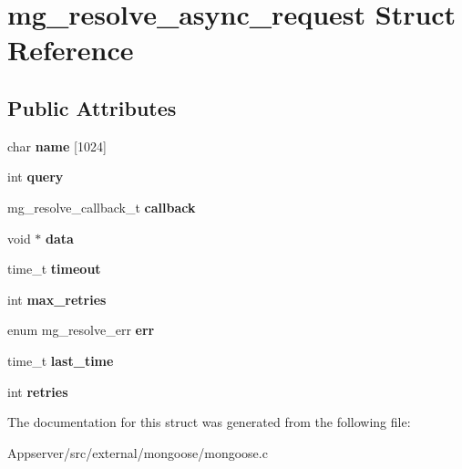 \hypertarget{structmg__resolve__async__request}{}\section{mg\+\_\+resolve\+\_\+async\+\_\+request Struct Reference}
\label{structmg__resolve__async__request}
\subsection*{Public Attributes}
\begin{DoxyCompactItemize}
\item 
char {\bfseries name} \mbox{[}1024\mbox{]}\hypertarget{structmg__resolve__async__request_a3d5bd5daeb6672a070322e3cf304eb75}{}\label{structmg__resolve__async__request_a3d5bd5daeb6672a070322e3cf304eb75}

\item 
int {\bfseries query}\hypertarget{structmg__resolve__async__request_aa7f0cbfc40e85f445d117e5804825dbe}{}\label{structmg__resolve__async__request_aa7f0cbfc40e85f445d117e5804825dbe}

\item 
mg\+\_\+resolve\+\_\+callback\+\_\+t {\bfseries callback}\hypertarget{structmg__resolve__async__request_ae07665c233e6a23b2e87075e325b0cab}{}\label{structmg__resolve__async__request_ae07665c233e6a23b2e87075e325b0cab}

\item 
void $\ast$ {\bfseries data}\hypertarget{structmg__resolve__async__request_aebb9fce193633d8f2112077ad1b39078}{}\label{structmg__resolve__async__request_aebb9fce193633d8f2112077ad1b39078}

\item 
time\+\_\+t {\bfseries timeout}\hypertarget{structmg__resolve__async__request_a591efe1d1186694f5a4e91a09c60ec89}{}\label{structmg__resolve__async__request_a591efe1d1186694f5a4e91a09c60ec89}

\item 
int {\bfseries max\+\_\+retries}\hypertarget{structmg__resolve__async__request_a0586dade9fff37fd19ee9967cf121536}{}\label{structmg__resolve__async__request_a0586dade9fff37fd19ee9967cf121536}

\item 
enum mg\+\_\+resolve\+\_\+err {\bfseries err}\hypertarget{structmg__resolve__async__request_a237f8c5e8a05698a7206dc0098d206f9}{}\label{structmg__resolve__async__request_a237f8c5e8a05698a7206dc0098d206f9}

\item 
time\+\_\+t {\bfseries last\+\_\+time}\hypertarget{structmg__resolve__async__request_a8ad1cbe9e2408b224d83e3d43e8e8275}{}\label{structmg__resolve__async__request_a8ad1cbe9e2408b224d83e3d43e8e8275}

\item 
int {\bfseries retries}\hypertarget{structmg__resolve__async__request_a64cca6891e31a194feb970363f14cd52}{}\label{structmg__resolve__async__request_a64cca6891e31a194feb970363f14cd52}

\end{DoxyCompactItemize}


The documentation for this struct was generated from the following file\+:\begin{DoxyCompactItemize}
\item 
Appserver/src/external/mongoose/mongoose.\+c\end{DoxyCompactItemize}
